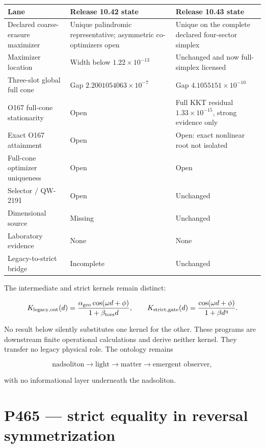 \documentclass[11pt,a4paper,openany]{report}
\begin{document}
\begin{center}
\begingroup\small
\setlength{\tabcolsep}{2.5pt}
\renewcommand{\arraystretch}{1.16}
\begin{longtable}{@{}p{}p{}p{}@{}}
\toprule
\textbf{Lane} & \textbf{Release 10.42 state} & \textbf{Release 10.43 state} \\
\midrule
\endhead
Declared coarse-erasure maximizer & Unique palindromic representative; asymmetric co-optimizers open & Unique on the complete declared four-sector simplex \\
Maximizer location & Width below \(1.22\times10^{-13}\) & Unchanged and now full-simplex licensed \\
Three-slot global full cone & Gap \(2.2001054063\times10^{-7}\) & Gap \(4.1055151\times10^{-10}\) \\
O167 full-cone stationarity & Open & Full KKT residual \(1.33\times10^{-15}\), strong evidence only \\
Exact O167 attainment & Open & Open: exact nonlinear root not isolated \\
Full-cone optimizer uniqueness & Open & Open \\
Selector /\allowbreak{} QW-2191 & Open & Unchanged \\
Dimensional source & Missing & Unchanged \\
Laboratory evidence & None & None \\
Legacy-to-strict bridge & Incomplete & Unchanged \\
\bottomrule
\end{longtable}
\endgroup
\end{center}

The intermediate and strict kernels remain distinct:

\[
K_{\rm legacy,ont}(d)=
\frac{\alpha_{\rm geo}\cos(\omega d+\phi)}
{1+\beta_{\rm tors}d},
\qquad
K_{\rm strict,gate}(d)=
\frac{\cos(\omega d+\phi)}{1+\beta d^\eta}.
\]

No result below silently substitutes one kernel for the other. These programs are downstream finite operational calculations and derive neither kernel. They transfer no legacy physical role. The ontology remains

\[
\text{nadsoliton}\longrightarrow\text{light}\longrightarrow
\text{matter}\longrightarrow\text{emergent observer},
\]

with no informational layer underneath the nadsoliton.

\chapter{P465 --- strict equality in reversal symmetrization}
\end{document}
